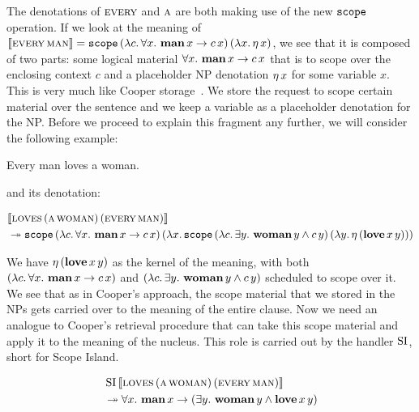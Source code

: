 The denotations of $\textsc{every}$ and $\textsc{a}$ are both making use of the
new $\mathtt{scope}$ operation. If we look at the meaning of
$\llbracket \textsc{every}\,\textsc{man} \rrbracket = \mathtt{scope}\,(\lambda c.\, \forall x.\
    \textbf{man}\,x \to c\,x)\,(\lambda x.\, \eta\,x)$, we see that
it is composed of two parts: some logical material
$\forall x.\ \textbf{man}\,x \to c\,x$ that is to scope over the
enclosing context $c$ and a placeholder NP denotation $\eta\,x$ for some
variable $x$. This is very much like Cooper
storage~\cite{cooper1979montague}. We store the request to scope certain
material over the sentence and we keep a variable as a placeholder
denotation for the NP. Before we proceed to explain this fragment any
further, we will consider the following example:

\begin{exe}
  \ex Every man loves a woman. \label{ex:quantifiers}
\end{exe}

and its denotation:

\NoChapterPrefix
\begin{align}
& \sem{\app{\abs{loves}}{(\ap{\abs{a}}{\abs{woman}})}{(\ap{\abs{every}}{\abs{man})}}} \nonumber \\
&\tto \app{\op{scope}}{(\lam{c}{\forall x.\ \ap{\obj{man}}{x} \to \ap{c}{x}})}{(\lam{x}{\app{\op{scope}}{(\lam{c}{\exists y.\ \ap{\obj{woman}}{y} \land \ap{c}{y}})}{(\lam{y}{\etaE{(\app{\obj{love}}{x}{y})}})}})}
\end{align}
\ChapterPrefix

We have $\eta\,(\textbf{love}\,x\,y)$ as the kernel of the meaning,
with both $(\lambda c.\, \forall x.\ \textbf{man}\,x \to c\,x)$ and
$(\lam{c}{\exists y.\ \ap{\obj{woman}}{y} \land \ap{c}{y}})$ scheduled to
scope over it. We see that as in Cooper's approach, the scope material that
we stored in the NPs gets carried over to the meaning of the entire
clause. Now we need an analogue to Cooper's retrieval procedure that can
take this scope material and apply it to the meaning of the nucleus. This
role is carried out by the handler $\operatorname{SI}$, short for Scope Island.

\begin{align*}
& \ap{\SI}{\sem{\app{\abs{loves}}{(\ap{\abs{a}}{\abs{woman}})}{(\ap{\abs{every}}{\abs{man}})}}} \\
&\tto \forall x.\ \ap{\obj{man}}{x} \to (\exists y.\ \ap{\obj{woman}}{y} \land \app{\obj{love}}{x}{y})
\end{align*}

